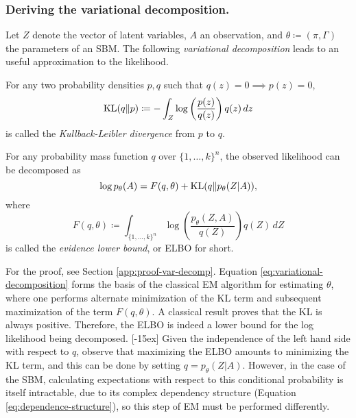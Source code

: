 \documentclass[../../main.tex]{subfiles} %
\begin{document}
\subsubsection{Deriving the variational 
decomposition.}
Let \(Z\) denote the vector of latent variables, \(A\) an observation, 
and \(\theta 
\coloneqq (\pi, \Gamma)\) the parameters of an SBM. The following 
\textit{variational decomposition} leads to an useful approximation 
to the 
likelihood.

\begin{definition}
	For any two probability densities \(p, q\) such that \(q(z) = 0 \implies 
	p(z) = 0\),
	\begin{equation}
		\operatorname{KL} (q \Vert p) \coloneqq -
		\int_{Z} \log \left( \frac{p (z)}{q(z)}
		\right) q(z) \, dz
	\end{equation}
	is called the \textit{Kullback-Leibler divergence} from \(p\) to 
	\(q\).
\end{definition}

\begin{theorem} \label{thm:var-decomp}
	For any probability mass function \(q\) over \(\{1, \dots, k\}^n\), the 
	observed 
	likelihood can be decomposed as
	\begin{equation}
		\log p_\theta (A) = F (q, \theta) + \operatorname{KL} (q \Vert p_\theta( Z \vert 
		A)),
		\label{eq:variational-decomposition}
	\end{equation}
	where
	\begin{equation}
		F (q, \theta) \coloneqq \int_{\{1, \dots, k\}^n} \log \left(
		\frac{p_\theta \left( Z, A\right)}{q(Z)} \right) q(Z) \, dZ
	\end{equation}
	is called the \textit{evidence lower bound}, or ELBO for short.
\end{theorem}

For the proof, see Section \ref{app:proof-var-decomp}. Equation 
\eqref{eq:variational-decomposition} forms the basis of the classical 
EM algorithm for estimating \(\theta\), where one performs alternate 
minimization of the KL term and subsequent maximization of the term 
\(F \left( q, \theta \right)\). 
A classical result proves that the KL is always positive. Therefore, the ELBO 
is indeed a lower bound for the log likelihood being decomposed. 
[-15ex] 
Given the independence of the left hand side with respect to $q$, observe that 
maximizing the ELBO amounts to minimizing the KL term, and this can be 
done by 
setting \(q = p_\theta(Z \vert A)\). However, in the case of the SBM, 
calculating expectations with respect to this conditional probability is itself 
intractable, due to its complex dependency structure (Equation 
\eqref{eq:dependence-structure}), so this step of EM must be performed 
differently.
\end{document}
